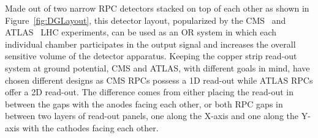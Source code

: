 	Made out of two narrow RPC detectors stacked on top of each other as shown in Figure~\ref{fig:DGLayout}, this detector layout, popularized by the CMS~\cite{MUONTDR} and ATLAS~\cite{ATLASTDR} LHC experiments, can be used as an OR system in which each individual chamber participates in the output signal and increases the overall sensitive volume of the detector apparatus. Keeping the copper strip read-out system at ground potential, CMS and ATLAS, with different goals in mind, have chosen different designs as CMS RPCs possess a 1D read-out while ATLAS RPCs offer a 2D read-out. The difference comes from either placing the read-out in between the gaps with the anodes facing each other, or both RPC gaps in between two layers of read-out panels, one along the X-axis and one along the Y-axis with the cathodes facing each other.
	
